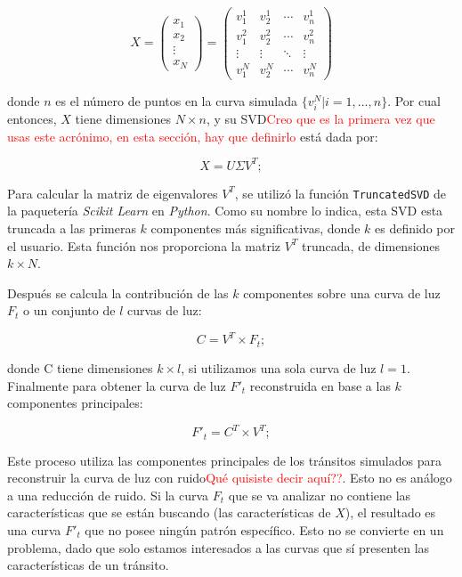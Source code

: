 \begin{equation}
  X = 
  \begin{pmatrix}
  x_{1} \\
  x_{2}\\
  \vdots  \\
  x_{N}
  \end{pmatrix}=
  \begin{pmatrix}
    v^{1}_{1} & v^{1}_{2} & \cdots & v^{1}_{n} \\
    v^{2}_{1} & v^{2}_{2} & \cdots & v^{2}_{n} \\
    \vdots  & \vdots  & \ddots & \vdots  \\
    v^{N}_{1} & v^{N}_{2} & \cdots & v^{N}_{n} 
  \end{pmatrix}
\end{equation}

donde $n$ es el número de puntos en la curva simulada $\{v^{N}_{i}|i=1,...,n\}$. Por cual entonces, $X$ tiene dimensiones $N\times n$, y su SVD\textcolor{red}{Creo que es la primera vez que usas este acrónimo, en esta sección, hay que definirlo}  está dada por:

\begin{equation}
  \displaystyle X=U\Sigma V^{T};
\end{equation}

Para calcular la matriz de eigenvalores $V^{T}$, se utilizó la función \texttt{TruncatedSVD} de la paquetería \textit{Scikit Learn} en \textit{Python}. Como su nombre lo indica, esta SVD esta truncada a las primeras $k$ componentes más significativas, donde $k$  es definido por el usuario. Esta función nos proporciona la matriz $V^{T}$ truncada, de dimensiones $k\times N$.

Después se calcula la contribución de las $k$ componentes sobre una curva de luz $F_{t}$ o un conjunto de $l$ curvas de luz:

\begin{equation}
  \displaystyle C=V^{T} \times F_{t};
\end{equation}

donde C tiene dimensiones $k\times l$, si utilizamos una sola curva de luz $l=1$. Finalmente para obtener la curva de luz $F'_{t}$ reconstruida en base a las $k$ componentes principales:

\begin{equation}
  \displaystyle F'_{t}=C^{T} \times V^{T};
\end{equation}

Este proceso utiliza las componentes principales de los tránsitos simulados para reconstruir la curva de luz con ruido\textcolor{red}{Qué quisiste decir aquí??}. Esto no es análogo a una reducción de ruido. Si la curva $F_{t}$ que se va analizar no contiene las características que se están buscando (las características de $X$), el resultado es una curva $F'_{t}$ que no posee ningún patrón específico. Esto no se convierte en un problema, dado que solo estamos interesados a las curvas que sí presenten las características de un tránsito.


